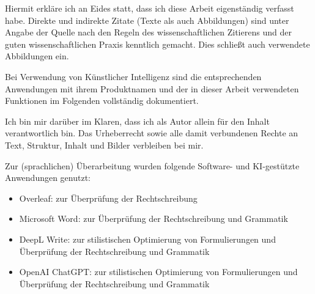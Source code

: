 \documentclass[12pt,a4paper,oneside,naustrian]{amsbook}
\numberwithin{section}{chapter}
\numberwithin{equation}{section}
\numberwithin{figure}{section}
\theoremstyle{plain}
\theoremstyle{plain}
\begin{document}
Hiermit erkläre ich an Eides statt, dass ich diese Arbeit eigenständig
verfasst habe. Direkte und indirekte Zitate (Texte als auch Abbildungen)
sind unter Angabe der Quelle nach den Regeln des wissenschaftlichen
Zitierens und der guten wissenschaftlichen Praxis kenntlich gemacht.
Dies schließt auch verwendete Abbildungen ein.

Bei Verwendung von Künstlicher Intelligenz sind die entsprechenden
Anwendungen mit ihrem Produktnamen und der in dieser Arbeit verwendeten
Funktionen im Folgenden vollständig dokumentiert.

Ich bin mir darüber im Klaren, dass ich als Autor allein für den Inhalt
verantwortlich bin. Das Urheberrecht sowie alle damit verbundenen Rechte
an Text, Struktur, Inhalt und Bilder verbleiben bei mir.

Zur (sprachlichen) Überarbeitung wurden folgende Software- und KI-gestützte Anwendungen genutzt:

\begin{itemize}
    \item Overleaf: zur Überprüfung der Rechtschreibung
    \item Microsoft Word: zur Überprüfung der Rechtschreibung und Grammatik
    \item DeepL Write: zur stilistischen Optimierung von Formulierungen und Überprüfung der Rechtschreibung und Grammatik
    \item OpenAI ChatGPT: zur stilistischen Optimierung von Formulierungen und Überprüfung der Rechtschreibung und Grammatik
\end{itemize}
\end{document}
